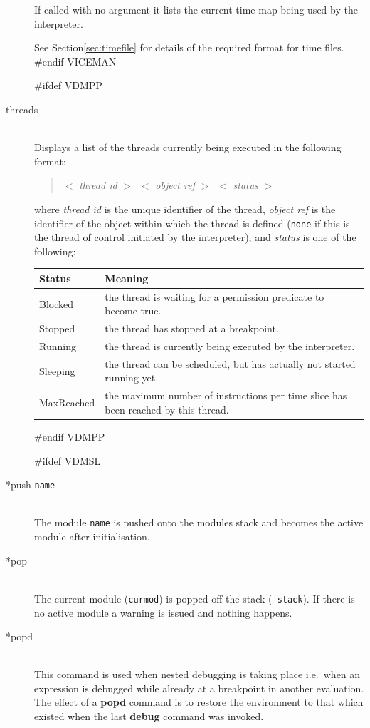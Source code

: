 \documentclass[\pformat,12pt]{article}
\begin{document}
\begin{description}
  If called with no argument it lists the current time map being
  used by the interpreter.
  
  See Section\ref{sec:timefile} for details of the required
  format for time files.
#endif VICEMAN

#ifdef VDMPP
\item[threads]\mbox{}\\
  Displays a list of the threads currently being executed in the
following format:

\begin{quote}
  $<$ \textit{thread id} $>$\ $<$ \textit{object ref} $>$\ $<$
\textit{status} $>$
\end{quote}

where \textit{thread id} is the unique identifier of the thread,
\textit{object ref} is the identifier of the object within which the
thread is defined (\texttt{none} if this is the thread of control
initiated by the interpreter), and \textit{status} is one of the
following:

\begin{tabular}{lp{10cm}}\hline
Status & Meaning \\ \hline
Blocked    & the thread is waiting for a permission predicate to
             become true. \\ 
Stopped    & the thread has stopped at a breakpoint.\\
Running    & the thread is currently being executed by the
interpreter. \\
Sleeping   & the thread can be
scheduled, but has actually not started running yet.\\
MaxReached & the maximum number of instructions per time slice has
              been reached by this thread. \\ \hline 
\end{tabular}
#endif VDMPP

#ifdef VDMSL
\item[*push {\tt name}] \mbox{}\\
  The module {\tt name}\/ is pushed onto the modules stack and becomes
  the active module after initialisation.
  
\item[*pop] \mbox{}\\
  The current module ({\tt curmod}) is popped off the stack ({\tt
    stack}). If there is no active module a warning is issued and
  nothing happens.
  
\item[*popd] \mbox{}\\
  This command is used when nested debugging is taking place i.e.\ when
  an expression is debugged while already at a breakpoint in another
  evaluation. The effect of a
  \textbf{popd} command is to restore the environment to that which
  existed when the last \textbf{debug} command was invoked.


\end{description}
\end{document}
